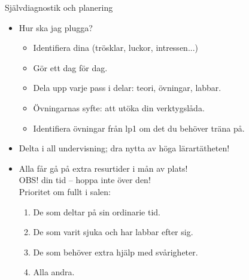 %
%
%

\begin{Slide}{Självdiagnostik och planering}
\begin{itemize}
  \item Hur ska jag plugga?
  \begin{itemize}
    \item Identifiera dina  (trösklar, luckor, intressen...)
    \item Gör ett  dag för dag.
    \item Dela upp varje pass i delar: teori, övningar, labbar. 
    \item Övningarnas syfte: att utöka din verktygslåda.
    \item Identifiera övningar från lp1 om det du behöver träna på.
  \end{itemize}
  \item Delta i all undervisning; dra nytta av höga lärartätheten!
  \item Alla får gå på extra resurtider i mån av plats!\\OBS!  din  tid -- hoppa inte över den!\\Prioritet om fullt i salen:
  \begin{enumerate}
    \item De som deltar på sin ordinarie tid.
    \item De som varit sjuka och har labbar efter sig.
    \item De som behöver extra hjälp med svårigheter.
    \item Alla andra.
  \end{enumerate}
\end{itemize}
\end{Slide}

